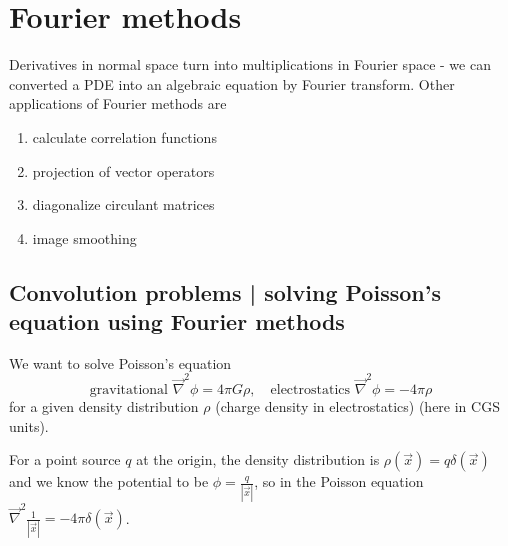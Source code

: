 \section{Fourier methods}
\thispagestyle{plain}

Derivatives in normal space turn into multiplications in Fourier space - we can converted
a PDE into an algebraic equation by Fourier transform. Other applications of Fourier
methods are

\begin{enumerate}
    \item calculate correlation functions
    \item projection of vector operators
    \item diagonalize circulant matrices
    \item image smoothing
\end{enumerate}

\subsection{Convolution problems | solving Poisson's equation using Fourier methods}
We want to solve Poisson's equation
\begin{equation}
    \text{gravitational } \vec{\nabla}^2 \phi = 4\pi G\rho, \quad \text{electrostatics } \vec{\nabla}^2 \phi = - 4 \pi \rho
\end{equation}
for a given density distribution $\rho$ (charge density in electrostatics) (here in CGS units).


For a point source $q$ at the origin, the density distribution is $\rho(\vec{x}) = q \delta(\vec{x})$ and we know the
potential to be $\phi = \frac{q}{|\vec{x}|}$, so in the Poisson equation $\vec{\nabla}^2 \frac{1}{|\vec{x}|} = -4\pi \delta (\vec{x})$.


